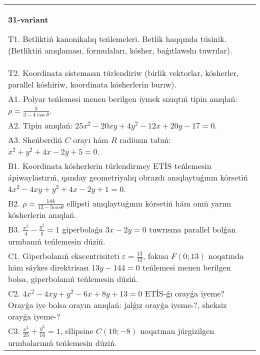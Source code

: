 \documentclass{article}
\begin{document}
\begin{tabular}{m{17cm}}
\textbf{31-variant}
\newline

T1. Betliktiń kanonikalıq teńlemeleri. Betlik haqqında túsinik. (Betliktiń anıqlaması, formulaları, kósher, baǵıtlawshı tuwrılar).\\

T2. Koordinata sistemasın túrlendiriw (birlik vektorlar, kósherler, parallel kóshiriw, koordinata kósherlerin burıw).\\

A1. Polyar teńlemesi menen berilgen iymek sızıqtıń tipin anıqlań: $\rho=\frac{5}{3-4\cos\theta}$.\\

A2. Tipin anıqlań: $25 x^{2}-20 xy+4 y^{2}-12 x+20 y-17=0$.\\

A3. Sheńberdiń $C$ orayı hám $R$ radiusın tabıń: $x^2+y^2+4 x-2 y+5=0$.\\

B1. Koordinata kósherlerin túrlendirmey ETİS teńlemesin ápiwaylastırıń, qanday geometriyalıq obrazdı anıqlaytuǵının kórsetiń $4x^{2} - 4xy + y^{2} + 4x - 2y + 1 = 0$.  \\

B2. $\rho = \frac{144}{13 - 5cos\theta}$ ellipsti anıqlaytuǵının kórsetiń hám onıń yarım kósherlerin anıqlań.\\

B3. $\frac{x^{2}}{4} - \frac{y^{2}}{5} = 1$ giperbolaǵa $3x - 2y = 0$ tuwrısına parallel bolǵan urınbanıń teńlemesin dúziń.  \\

C1. Giperbolanıń ekscentrisiteti $\varepsilon = \frac{13}{12}$, fokusı $F(0;13)$ noqatında hám sáykes direktrisası $13y - 144 = 0$ teńlemesi menen berilgen bolsa, giperbolanıń teńlemesin dúziń.  \\

C2. $4x^{2} - 4xy + y^{2} - 6x + 8y + 13 = 0$ ETİS-ǵı orayǵa iyeme? Orayǵa iye bolsa orayın anıqlań: jalǵız orayǵa iyeme-?, sheksiz orayǵa iyeme-?  \\

C3. $\frac{x^{2}}{25} + \frac{y^{2}}{16} = 1$, ellipsine $C(10; - 8)$ noqatınan júrgizilgen urınbalarınıń teńlemesin dúziń.  \\

\end{tabular}
\vspace{1cm}
\end{document}
